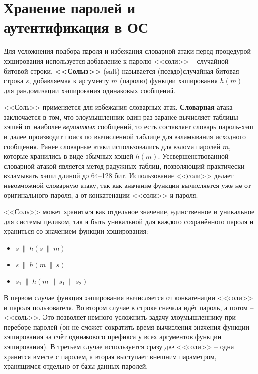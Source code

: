 \section[Пароли и аутентификация в ОС]{Хранение паролей и \protect\\ аутентификация в ОС}

Для усложнения подбора пароля и избежания словарной атаки перед процедурой хэширования используется добавление к паролю <<соли>> -- случайной битовой строки. \textbf{<<Солью>>} (salt) называется (псевдо)случайная битовая строка $s$, добавляемая к аргументу $m$ (паролю) функции хэширования $h(m)$ для рандомизации хэширования одинаковых сообщений.

<<Соль>> применяется для избежания словарных атак. \textbf{Словарная} атака заключается в том, что злоумышленник один раз заранее вычисляет таблицы хэшей от наиболее \emph{вероятных} сообщений, то есть составляет словарь пароль-хэш и далее производит поиск по вычисленной таблице для взламывания исходного сообщения. Ранее словарные атаки использовались для взлома паролей $m$, которые хранились в виде обычных хэшей $h(m)$. Усовершенствованной словарной атакой является метод радужных таблиц, позволяющий практически взламывать хэши длиной до 64--128 бит. Использование <<соли>> делает невозможной словарную атаку, так как значение функции вычисляется уже не от оригинального пароля, а от конкатенации <<соли>> и пароля.

<<Соль>> может храниться как отдельное значение, единственное и уникальное для системы целиком, так и быть уникальной для каждого сохранённого пароля и храниться со значением функции хэширования:
\begin{itemize}
	\item $s ~\|~ h(s ~\|~ m)$
	\item $s ~\|~ h(m ~\|~ s)$
	\item $s_1 ~\|~ h(m ~\|~ s_1 ~\|~ s_2)$
\end{itemize}

В первом случае функция хэширования вычисляется от конкатенации <<соли>> и пароля пользователя. Во втором случае в строке сначала идёт пароль, а потом -- <<соль>>. Это позволяет немного усложнить задачу злоумышленнику при переборе паролей (он не сможет сократить время вычисления значения функции хэширования за счёт одинакового префикса у всех аргументов функции хэширования). В третьем случае используется сразу две <<соли>> -- одна хранится вместе с паролем, а вторая выступает внешним параметром, хранящимся отдельно от базы данных паролей.

